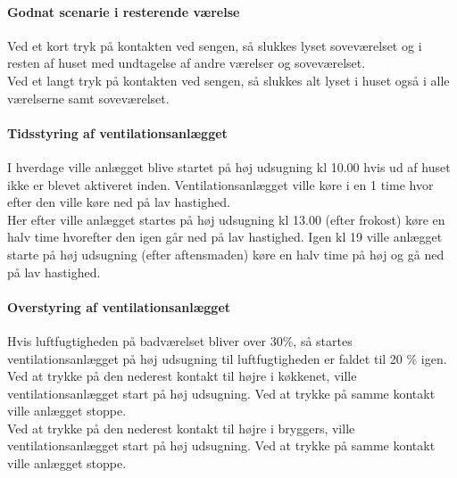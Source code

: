 \paragraph{Godnat scenarie i resterende værelse}
Ved et kort tryk på kontakten ved sengen, 
så slukkes lyset soveværelset og i resten af huset med undtagelse af andre værelser og soveværelset. \\
Ved et langt tryk på kontakten ved sengen, 
så slukkes alt lyset i huset også i alle værelserne samt soveværelset.

\paragraph{Tidsstyring af ventilationsanlægget}
I hverdage ville anlægget blive startet på høj udsugning kl 10.00 hvis ud af huset ikke er blevet aktiveret inden. 
Ventilationsanlægget ville køre i en 1 time hvor efter den ville køre ned på lav hastighed. \\
Her efter ville anlægget startes på høj udsugning kl 13.00 (efter frokost) køre en halv time hvorefter den igen går ned på lav hastighed.
Igen kl 19 ville anlægget starte på høj udsugning (efter aftensmaden) køre en halv time på høj og gå ned på lav hastighed.

\paragraph{Overstyring af ventilationsanlægget}
Hvis luftfugtigheden på badværelset bliver over 30\%, så startes ventilationsanlægget på høj udsugning til luftfugtigheden er faldet til 20 \% igen. \\
Ved at trykke på den nederest kontakt til højre i køkkenet, ville ventilationsanlægget start på høj udsugning. Ved at trykke på samme kontakt ville anlægget stoppe. \\
Ved at trykke på den nederest kontakt til højre i bryggers, ville ventilationsanlægget start på høj udsugning. Ved at trykke på samme kontakt ville anlægget stoppe.


